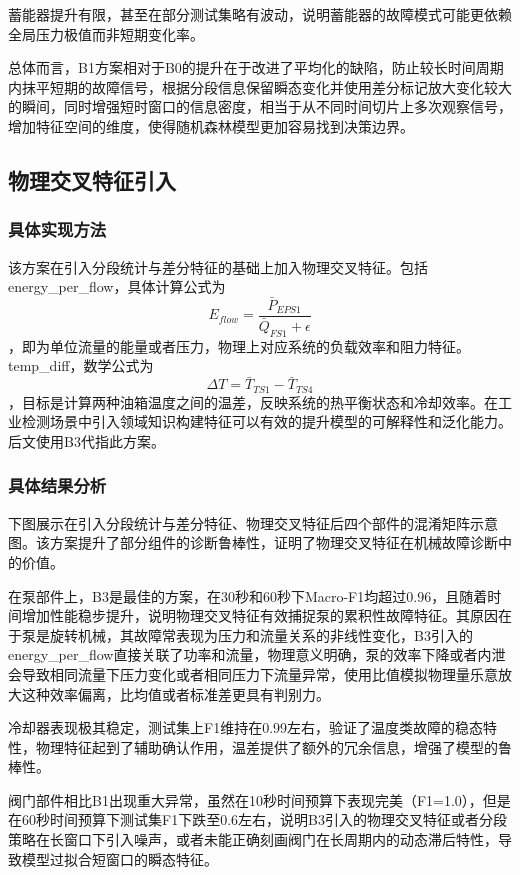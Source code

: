 \documentclass[12pt, a4paper]{ctexart}
\begin{document}
蓄能器提升有限，甚至在部分测试集略有波动，说明蓄能器的故障模式可能更依赖全局压力极值而非短期变化率。

总体而言，B1方案相对于B0的提升在于改进了平均化的缺陷，防止较长时间周期内抹平短期的故障信号，根据分段信息保留瞬态变化并使用差分标记放大变化较大的瞬间，同时增强短时窗口的信息密度，相当于从不同时间切片上多次观察信号，增加特征空间的维度，使得随机森林模型更加容易找到决策边界。
\subsection{物理交叉特征引入}
\subsubsection{具体实现方法}
该方案在引入分段统计与差分特征的基础上加入物理交叉特征。包括energy\_per\_flow，具体计算公式为$$E_{flow} =\frac{\bar{P}_{EPS1}}{\bar{Q}_{FS1} + \epsilon}$$，即为单位流量的能量或者压力，物理上对应系统的负载效率和阻力特征。temp\_diff，数学公式为$$\Delta T = \bar{T}_{TS1} - \bar{T}_{TS4}$$，目标是计算两种油箱温度之间的温差，反映系统的热平衡状态和冷却效率。在工业检测场景中引入领域知识构建特征可以有效的提升模型的可解释性和泛化能力。后文使用B3代指此方案。
\subsubsection{具体结果分析}
下图展示在引入分段统计与差分特征、物理交叉特征后四个部件的混淆矩阵示意图。该方案提升了部分组件的诊断鲁棒性，证明了物理交叉特征在机械故障诊断中的价值。

在泵部件上，B3是最佳的方案，在30秒和60秒下Macro-F1均超过0.96，且随着时间增加性能稳步提升，说明物理交叉特征有效捕捉泵的累积性故障特征。其原因在于泵是旋转机械，其故障常表现为压力和流量关系的非线性变化，B3引入的energy\_per\_flow直接关联了功率和流量，物理意义明确，泵的效率下降或者内泄会导致相同流量下压力变化或者相同压力下流量异常，使用比值模拟物理量乐意放大这种效率偏离，比均值或者标准差更具有判别力。

冷却器表现极其稳定，测试集上F1维持在0.99左右，验证了温度类故障的稳态特性，物理特征起到了辅助确认作用，温差提供了额外的冗余信息，增强了模型的鲁棒性。

阀门部件相比B1出现重大异常，虽然在10秒时间预算下表现完美（F1=1.0），但是在60秒时间预算下测试集F1下跌至0.6左右，说明B3引入的物理交叉特征或者分段策略在长窗口下引入噪声，或者未能正确刻画阀门在长周期内的动态滞后特性，导致模型过拟合短窗口的瞬态特征。
\end{document}
